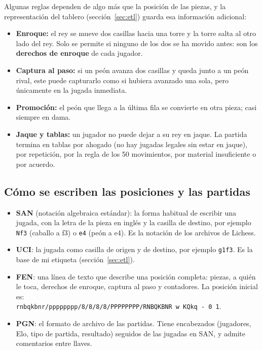 \documentclass[a4paper,12pt,twocolumn]{article}
\begin{document}
Algunas reglas dependen de algo más que la posición de las piezas, y la representación del tablero (sección~\ref{sec:etl}) guarda esa información adicional:
\begin{itemize}[leftmargin=*]
	\item \textbf{Enroque:} el rey se mueve dos casillas hacia una torre y la torre salta al otro lado del rey. Solo se permite si ninguno de los dos se ha movido antes: son los \textbf{derechos de enroque} de cada jugador.
	\item \textbf{Captura al paso:} si un peón avanza dos casillas y queda junto a un peón rival, este puede capturarlo como si hubiera avanzado una sola, pero únicamente en la jugada inmediata.
	\item \textbf{Promoción:} el peón que llega a la última fila se convierte en otra pieza; casi siempre en dama.
	\item \textbf{Jaque y tablas:} un jugador no puede dejar a su rey en jaque. La partida termina en tablas por ahogado (no hay jugadas legales sin estar en jaque), por repetición, por la regla de los 50 movimientos, por material insuficiente o por acuerdo.
\end{itemize}

\subsection{Cómo se escriben las posiciones y las partidas}

\begin{itemize}[leftmargin=*]
	\item \textbf{SAN} (notación algebraica estándar): la forma habitual de escribir una jugada, con la letra de la pieza en inglés y la casilla de destino, por ejemplo \texttt{Nf3} (caballo a f3) o \texttt{e4} (peón a e4). Es la notación de los archivos de Lichess.
	\item \textbf{UCI}: la jugada como casilla de origen y de destino, por ejemplo \texttt{g1f3}. Es la base de mi etiqueta (sección~\ref{sec:etl}).
	\item \textbf{FEN}: una línea de texto que describe una posición completa: piezas, a quién le toca, derechos de enroque, captura al paso y contadores. La posición inicial es:\\ {\footnotesize\texttt{rnbqkbnr/pppppppp/8/8/8/8/\allowbreak PPPPPPPP/RNBQKBNR w KQkq - 0 1}}.
	\item \textbf{PGN}: el formato de archivo de las partidas. Tiene encabezados (jugadores, Elo, tipo de partida, resultado) seguidos de las jugadas en SAN, y admite comentarios entre llaves.
\end{itemize}
\end{document}
